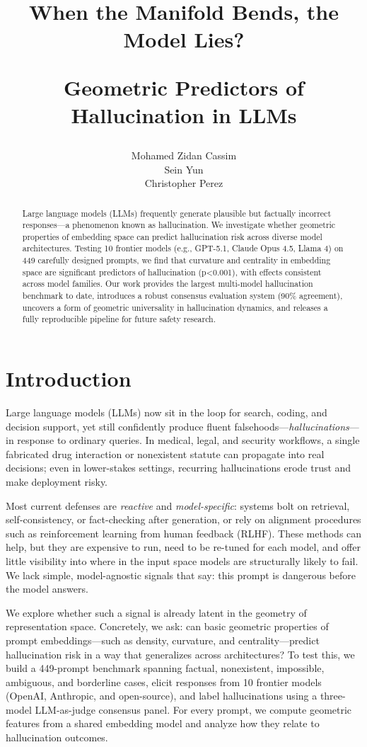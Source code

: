 \documentclass{article}
\title{When the Manifold Bends, the Model Lies? 

Geometric Predictors of Hallucination in LLMs}
\author{%
  Mohamed Zidan Cassim \\
  \And
  Sein Yun \\
  \And
  Christopher Perez 
}
\begin{document}
\maketitle


\begin{abstract}
  Large language models (LLMs) frequently generate plausible but factually incorrect responses—a phenomenon known as hallucination. We investigate whether geometric properties of embedding space can predict hallucination risk across diverse model architectures. Testing 10 frontier models (e.g., GPT-5.1, Claude Opus 4.5, Llama 4) on 449 carefully designed prompts, we find that curvature and centrality in embedding space are significant predictors of hallucination (p<0.001), with effects consistent across model families. Our work provides the largest multi-model hallucination benchmark to date, introduces a robust consensus evaluation system (90\% agreement), uncovers a form of geometric universality in hallucination dynamics, and releases a fully reproducible pipeline for future safety research.
\end{abstract}

\section{Introduction}
    Large language models (LLMs) now sit in the loop for search, coding, and decision support, yet still confidently produce fluent falsehoods---\emph{hallucinations}---in response to ordinary queries. In medical, legal, and security workflows, a single fabricated drug interaction or nonexistent statute can propagate into real decisions; even in lower-stakes settings, recurring hallucinations erode trust and make deployment risky.

Most current defenses are \emph{reactive} and \emph{model-specific}: systems bolt on retrieval, self-consistency, or fact-checking after generation, or rely on alignment procedures such as reinforcement learning from human feedback (RLHF). These methods can help, but they are expensive to run, need to be re-tuned for each model, and offer little visibility into where in the input space models are structurally likely to fail. We lack simple, model-agnostic signals that say: this prompt is dangerous before the model answers.

We explore whether such a signal is already latent in the geometry of representation space. Concretely, we ask: can basic geometric properties of prompt embeddings---such as density, curvature, and centrality---predict hallucination risk in a way that generalizes across architectures? To test this, we build a 449-prompt benchmark spanning factual, nonexistent, impossible, ambiguous, and borderline cases, elicit responses from 10 frontier models (OpenAI, Anthropic, and open-source), and label hallucinations using a three-model LLM-as-judge consensus panel. For every prompt, we compute geometric features from a shared embedding model and analyze how they relate to hallucination outcomes.
\end{document}
